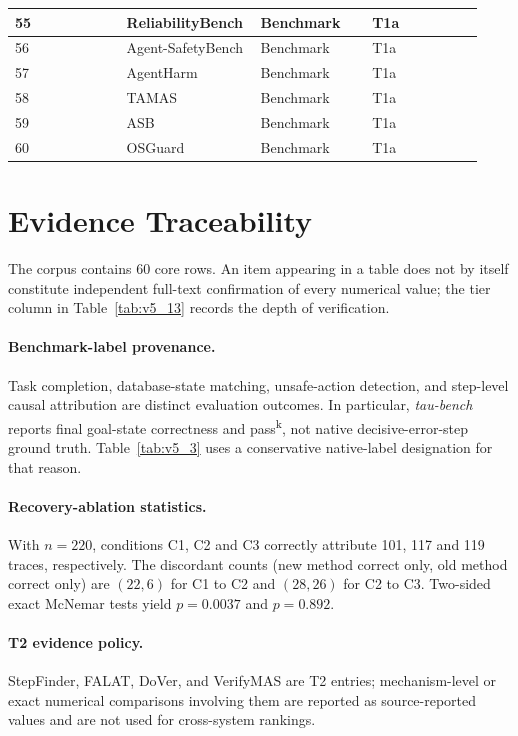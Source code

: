 \documentclass[preprint,12pt]{elsarticle}
\begin{document}
\begin{center}
\begin{longtable}{|p{0.233\linewidth}|p{0.233\linewidth}|p{0.233\linewidth}|p{0.233\linewidth}|}
55 & ReliabilityBench & Benchmark & T1a \\ \hline
56 & Agent-SafetyBench & Benchmark & T1a \\ \hline
57 & AgentHarm & Benchmark & T1a \\ \hline
58 & TAMAS & Benchmark & T1a \\ \hline
59 & ASB & Benchmark & T1a \\ \hline
60 & OSGuard & Benchmark & T1a \\ \hline
\end{longtable}
\endgroup
\end{center}

\section{Evidence Traceability}
\label{sec:evidence-audit}
The corpus contains 60 core rows. An item appearing in a table does not by
itself constitute independent full-text confirmation of every numerical value;
the tier column in Table~\ref{tab:v5_13} records the depth of verification.

\paragraph{Benchmark-label provenance.}
Task completion, database-state matching, unsafe-action detection, and
step-level causal attribution are distinct evaluation outcomes. In particular,
\emph{tau-bench} reports final goal-state correctness and pass\textsuperscript{k},
not native decisive-error-step ground truth. Table~\ref{tab:v5_3} uses a
conservative native-label designation for that reason.

\paragraph{Recovery-ablation statistics.}
With $n=220$, conditions C1, C2 and C3 correctly attribute 101, 117 and 119
traces, respectively. The discordant counts (new method correct only, old
method correct only) are $(22,6)$ for C1 to C2 and $(28,26)$ for C2 to C3.
Two-sided exact McNemar tests yield $p=0.0037$ and $p=0.892$.

\paragraph{T2 evidence policy.}
StepFinder, FALAT, DoVer, and VerifyMAS are T2 entries; mechanism-level or
exact numerical comparisons involving them are reported as source-reported
values and are not used for cross-system rankings.
\end{document}
